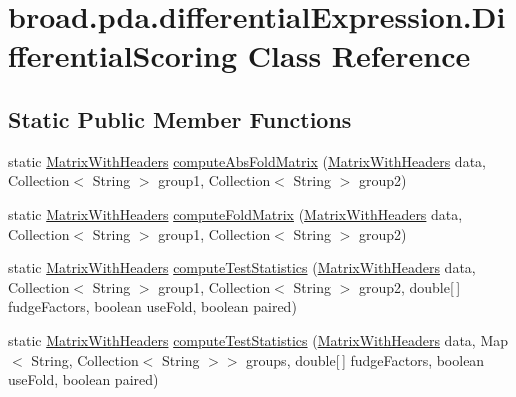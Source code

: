 \hypertarget{classbroad_1_1pda_1_1differential_expression_1_1_differential_scoring}{\section{broad.\+pda.\+differential\+Expression.\+Differential\+Scoring Class Reference}
\label{classbroad_1_1pda_1_1differential_expression_1_1_differential_scoring}
}
\subsection*{Static Public Member Functions}
\begin{DoxyCompactItemize}
\item 
static \hyperlink{classbroad_1_1core_1_1datastructures_1_1_matrix_with_headers}{Matrix\+With\+Headers} \hyperlink{classbroad_1_1pda_1_1differential_expression_1_1_differential_scoring_a0412d7c9e49d4aaffb91eda091b48a26}{compute\+Abs\+Fold\+Matrix} (\hyperlink{classbroad_1_1core_1_1datastructures_1_1_matrix_with_headers}{Matrix\+With\+Headers} data, Collection$<$ String $>$ group1, Collection$<$ String $>$ group2)
\item 
static \hyperlink{classbroad_1_1core_1_1datastructures_1_1_matrix_with_headers}{Matrix\+With\+Headers} \hyperlink{classbroad_1_1pda_1_1differential_expression_1_1_differential_scoring_a3bab659a18e1c6ba69833a89bf6d0d4c}{compute\+Fold\+Matrix} (\hyperlink{classbroad_1_1core_1_1datastructures_1_1_matrix_with_headers}{Matrix\+With\+Headers} data, Collection$<$ String $>$ group1, Collection$<$ String $>$ group2)
\item 
static \hyperlink{classbroad_1_1core_1_1datastructures_1_1_matrix_with_headers}{Matrix\+With\+Headers} \hyperlink{classbroad_1_1pda_1_1differential_expression_1_1_differential_scoring_abf56213c28a2bf6b919b42ebdbf2d003}{compute\+Test\+Statistics} (\hyperlink{classbroad_1_1core_1_1datastructures_1_1_matrix_with_headers}{Matrix\+With\+Headers} data, Collection$<$ String $>$ group1, Collection$<$ String $>$ group2, double\mbox{[}$\,$\mbox{]} fudge\+Factors, boolean use\+Fold, boolean paired)
\item 
static \hyperlink{classbroad_1_1core_1_1datastructures_1_1_matrix_with_headers}{Matrix\+With\+Headers} \hyperlink{classbroad_1_1pda_1_1differential_expression_1_1_differential_scoring_a7e5cc3b929e64d3243b3d921b07863e7}{compute\+Test\+Statistics} (\hyperlink{classbroad_1_1core_1_1datastructures_1_1_matrix_with_headers}{Matrix\+With\+Headers} data, Map$<$ String, Collection$<$ String $>$$>$ groups, double\mbox{[}$\,$\mbox{]} fudge\+Factors, boolean use\+Fold, boolean paired)
\end{DoxyCompactItemize}


